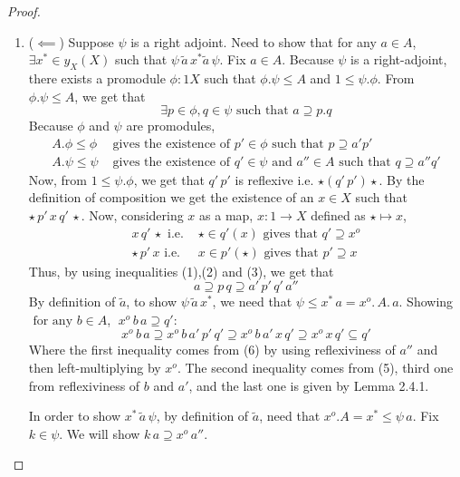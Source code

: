 \documentclass[18pt,a4paper]{article}
\makeatletter
\theoremstyle{definition}
\newcommand{\carrow}{}%
\DeclareRobustCommand{\carrow}{%
	\mathrel{\vphantom{\rightarrow}\mathpalette\circle@arrow\relax}%
}
\newcommand{\circle@arrow}[2]{%
	\m@th
	\ooalign{%
		\hidewidth$#1\circ\mkern1mu$\hidewidth\cr
	$#1\longrightarrow$\cr}%
}
\makeatother
\begin{document}
\begin{proof}
\begin{enumerate}[label=(\roman*)]
				\item ($\impliedby$) Suppose $\psi$ is a right adjoint. Need to show that for any
					$a \in A$, $\exists x^* \in y_X(X)$ such that $\psi \, \tilde{a} \,x^*
					\tilde{a} \, \psi$. Fix $a \in A$. Because $\psi$ is a right-adjoint, there
					exists a promodule $\phi: 1 \carrow X$ such that $\phi.\psi \leq A$ and
					$1\leq \psi.\phi$. From $\phi.\psi \leq A$, we get that
					\begin{equation}\exists p \in \phi, q \in \psi \text{ such that }
						a \supseteq p.q
					\end{equation}
					Because $\phi$ and $\psi$ are promodules,
					\begin{align}
						A.\phi \leq \phi & \text{ gives the existence of } p' \in \phi \text{ such that } p\supseteq a'p'  \\
						A.\psi \leq \psi & \text{ gives the existence of } q' \in \psi \text{ and } a'' \in A
						\text{ such that } q \supseteq a''q'
					\end{align}
					Now, from $1 \leq \psi.\phi$, we get that $q'\,p'$ is reflexive i.e. $\star (q' \,p')
					\star$. By the definition of composition we get the existence of an $x \in X$
					such that $\star \, p' \, x \,q'\,\star$. Now, considering $x$ as a map, $x:1 \to X$
					defined as $\star \mapsto x$,
					\begin{align}
						x \, q' \, \star \text{ i.e. } &\star \in q'(x) \text{ gives that }
						q' \supseteq x^o \\
						\star \,p' \, x \text{ i.e. } &x \in p'(\star) \text{ gives that }
						p'\supseteq x
					\end{align}
					Thus, by using inequalities (1),(2) and (3), we get that
					\begin{equation}
						a \supseteq p\,q \supseteq a'\,p'\,q'\,a''
					\end{equation}
					By definition of $\tilde{a}$, to show $\psi \, \tilde{a} \, x^*$,
					we need that $\psi \leq x^*\,a=x^o.\,A.\,a$. Showing
					$\text{ for any } b\in A$, $\;  x^o\,b\,a \supseteq q'$:
					\[ x^o\,b\,a \supseteq x^o\,b\,a'\,p'\,q' \supseteq x^o\,b\,a'\,x\,q'
					\supseteq x^o\,x\,q' \subseteq q'\]
					Where the first inequality comes from (6) by using reflexiviness of $a''$ and then
					left-multiplying by $x^o$. The second inequality comes from (5),
					third one from reflexiviness of $b$ and $a'$,
					and the last one is given by Lemma 2.4.1.

					In order to show $x^* \, \tilde{a} \, \psi$, by definition of $\tilde{a}$,
					need that $x^o.A=x^* \leq \psi\,a$. Fix $k\in \psi$. We will show
					$k\,a \supseteq x^o \, a''$.


\end{enumerate}
\end{proof}
\end{document}
